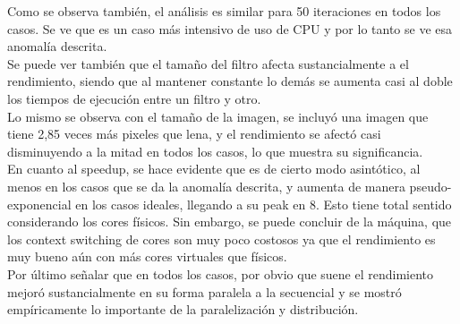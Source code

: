 \documentclass[letterpaper,10pt]{article}
\begin{document}
Como se observa también, el análisis es similar para 50 iteraciones en todos los casos. Se ve que es un caso más intensivo de uso de CPU y por lo tanto se ve esa anomalía descrita.\\

Se puede ver también que el tamaño del filtro afecta sustancialmente a el rendimiento, siendo que al mantener constante lo demás se aumenta casi al doble los tiempos de ejecución entre un filtro y otro.\\

Lo mismo se observa con el tamaño de la imagen, se incluyó una imagen que tiene 2,85 veces más pixeles que lena, y el rendimiento se afectó casi disminuyendo a la mitad en todos los casos, lo que muestra su significancia.\\

En cuanto al speedup, se hace evidente que es de cierto modo asintótico, al menos en los casos que se da la anomalía descrita, y aumenta de manera pseudo-exponencial en los casos ideales, llegando a su peak en 8. Esto tiene total sentido considerando los cores físicos. Sin embargo, se puede concluir de la máquina, que los context switching de cores son muy poco costosos ya que el rendimiento es muy bueno aún con más cores virtuales que físicos.\\

Por último señalar que en todos los casos, por obvio que suene el rendimiento mejoró sustancialmente en su forma paralela a la secuencial y se mostró empíricamente lo importante de la paralelización y distribución.
\end{document}
